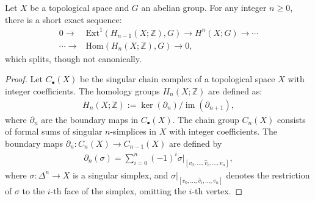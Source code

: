 \begin{theorem}{\cite{hatcher2005algebraic}}
\label{UniversalCoefficientsforCohomology}
Let $X$ be a topological space and $G$ an abelian group. For any integer $n \geq 0$, there is a short exact sequence:
\begin{align}
0 \rightarrow &\text{Ext}^{1}(H_{n-1}(X;\mathbb{Z}), G) \rightarrow H^{n}(X; G) \rightarrow \cdots \\
\cdots \rightarrow &\text{Hom}(H_{n}(X;\mathbb{Z}), G) \rightarrow 0,
\end{align}
which splits, though not canonically.
\end{theorem}

\begin{proof}
Let $C_{\bullet}(X)$ be the singular chain complex of a topological space $X$ with integer coefficients. The homology groups $H_{n}(X; \mathbb{Z})$ are defined as:
\begin{align}
H_{n}(X; \mathbb{Z}) := \ker(\partial_{n}) / \operatorname{im}(\partial_{n+1}),
\end{align}
where $\partial_{n}$ are the boundary maps in $C_{\bullet}(X)$. The chain group $C_{n}(X)$ consists of formal sums of singular $n$-simplices in $X$ with integer coefficients. The boundary maps $\partial_{n}: C_{n}(X) \rightarrow C_{n-1}(X)$ are defined by
\begin{align}
\partial_{n}(\sigma) = \sum_{i=0}^{n}(-1)^{i} \sigma|_{[v_0, \ldots, \hat{v}_i, \ldots, v_n]},
\end{align}
where $\sigma: \Delta^{n} \rightarrow X$ is a singular simplex, and $\sigma|_{[v_0, \ldots, \hat{v}_i, \ldots, v_n]}$ denotes the restriction of $\sigma$ to the $i$-th face of the simplex, omitting the $i$-th vertex.


\end{proof}
